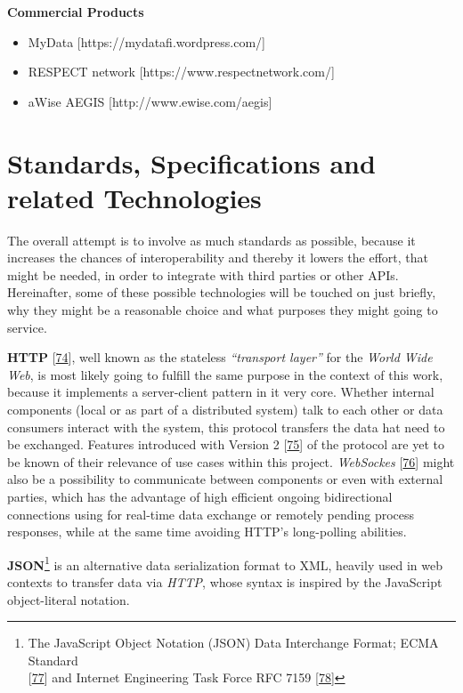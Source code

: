 \documentclass[12pt,english,a4paper,titlepage,cleardoublepage=empty,dottedtoc]{report}
\providecommand{\tightlist}{%
  \setlength{\itemsep}{0pt}\setlength{\parskip}{0pt}}
\begin{document}
\textbf{Commercial Products}

\begin{itemize}
\tightlist
\item
  MyData {[}https://mydatafi.wordpress.com/{]}
\item
  RESPECT network {[}https://www.respectnetwork.com/{]}
\item
  aWise AEGIS {[}http://www.ewise.com/aegis{]}
\end{itemize}

\hypertarget{standards-specifications-and-related-technologies}{\section{Standards,
Specifications and related
Technologies}\label{standards-specifications-and-related-technologies}}

The overall attempt is to involve as much standards as possible, because
it increases the chances of interoperability and thereby it lowers the
effort, that might be needed, in order to integrate with third parties
or other APIs. Hereinafter, some of these possible technologies will be
touched on just briefly, why they might be a reasonable choice and what
purposes they might going to service.

\textbf{\protect\hypertarget{link_http}{}{HTTP}}
{[}\protect\hyperlink{ref-web_spec_http1}{74}{]}, well known as the
stateless \emph{``transport layer''} for the \emph{World Wide Web}, is
most likely going to fulfill the same purpose in the context of this
work, because it implements a server-client pattern in it very core.
Whether internal components (local or as part of a distributed system)
talk to each other or data consumers interact with the system, this
protocol transfers the data hat need to be exchanged. Features
introduced with Version 2
{[}\protect\hyperlink{ref-web_spec_http2}{75}{]} of the protocol are yet
to be known of their relevance of use cases within this project.
\emph{WebSockes} {[}\protect\hyperlink{ref-web_spec_websockets}{76}{]}
might also be a possibility to communicate between components or even
with external parties, which has the advantage of high efficient ongoing
bidirectional connections using for real-time data exchange or remotely
pending process responses, while at the same time avoiding HTTP's
long-polling abilities.

\textbf{JSON}\footnote{The JavaScript Object Notation (JSON) Data
  Interchange Format; ECMA Standard\\
  {[}\protect\hyperlink{ref-web_spec_json}{77}{]} and Internet
  Engineering Task Force RFC 7159
  {[}\protect\hyperlink{ref-web_rfc_json}{78}{]}} is an alternative data
serialization format to XML, heavily used in web contexts to transfer
data via \emph{HTTP}, whose syntax is inspired by the JavaScript
object-literal notation.
\end{document}
